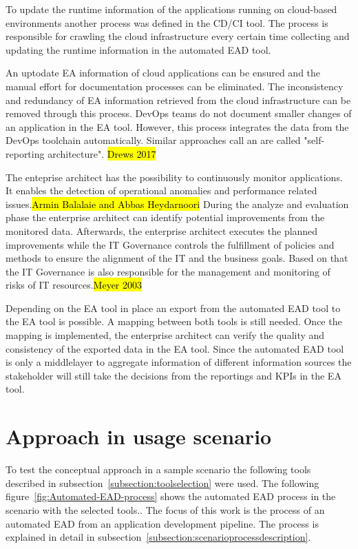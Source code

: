To update the runtime information of the applications running on cloud-based environments another process was defined in the CD/CI tool. The process is responsible for crawling the cloud infrastructure every certain time collecting and updating the runtime information in the automated EAD tool.

An uptodate EA information of cloud applications can be ensured and the manual effort for documentation processes can be eliminated. The inconsistency and redundancy of EA information retrieved from the cloud infrastructure can be removed through this process.
DevOps teams do not document smaller changes of an application in the EA tool. However, this process integrates the data from the DevOps toolchain automatically. Similar approaches call an are called "self-reporting architecture". \hl{Drews 2017}

The enteprise architect has the possibility to continuously monitor applications. It enables the detection of operational anomalies and performance related issues.\hl{Armin Balalaie and Abbas Heydarnoori} During the analyze and evaluation phase the enterprise architect can identify potential improvements from the monitored data. Afterwards, the enterprise architect executes the planned improvements while the IT Governance controls the fulfillment of policies and methods to ensure the alignment of the IT and the business goals. Based on that the IT Governance is also responsible for the management and monitoring of risks of IT resources.\hl{Meyer 2003}

Depending on the EA tool in place an export from the automated EAD tool to the EA tool is possible. A mapping between both tools is still needed. Once the mapping is implemented, the enterprise architect can verify the quality and consistency of the exported data in the EA tool. Since the automated EAD tool is only a middlelayer to aggregate information of different information sources the stakeholder will still take the decisions from the reportings and KPIs in the EA tool.

\section{Approach in usage scenario}\label{section:approach-usage-scenario}

To test the conceptual approach in a sample scenario the following tools described in subsection~\ref{subsection:toolselection} were used. The following figure~\ref{fig:Automated-EAD-process} shows the automated EAD process in the scenario with the selected tools.. The focus of this work is the process of an automated EAD from an application development pipeline. The process is explained in detail in subsection~\ref{subsection:scenarioprocessdescription}.

